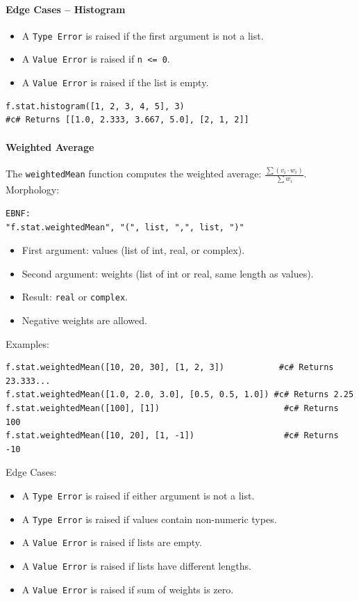 \paragraph{Edge Cases -- Histogram}
\begin{itemize}
\item A \texttt{Type Error} is raised if the first argument is not a list.
\item A \texttt{Value Error} is raised if \texttt{n <= 0}.
\item A \texttt{Value Error} is raised if the list is empty.
\end{itemize}

\begin{verbatim}
f.stat.histogram([1, 2, 3, 4, 5], 3)
#c# Returns [[1.0, 2.333, 3.667, 5.0], [2, 1, 2]]
\end{verbatim}

\paragraph{Weighted Average}
The \texttt{weightedMean} function computes the weighted average: $\frac{\sum(v_i \cdot w_i)}{\sum w_i}$.\\
Morphology:
\begin{verbatim}
EBNF:
"f.stat.weightedMean", "(", list, ",", list, ")"
\end{verbatim}
\begin{itemize}
\item First argument: values (list of int, real, or complex).
\item Second argument: weights (list of int or real, same length as values).
\item Result: \texttt{real} or \texttt{complex}.
\item Negative weights are allowed.
\end{itemize}

Examples:
\begin{verbatim}
f.stat.weightedMean([10, 20, 30], [1, 2, 3])           #c# Returns 23.333...
f.stat.weightedMean([1.0, 2.0, 3.0], [0.5, 0.5, 1.0]) #c# Returns 2.25
f.stat.weightedMean([100], [1])                         #c# Returns 100
f.stat.weightedMean([10, 20], [1, -1])                  #c# Returns -10
\end{verbatim}

Edge Cases:
\begin{itemize}
\item A \texttt{Type Error} is raised if either argument is not a list.
\item A \texttt{Type Error} is raised if values contain non-numeric types.
\item A \texttt{Value Error} is raised if lists are empty.
\item A \texttt{Value Error} is raised if lists have different lengths.
\item A \texttt{Value Error} is raised if sum of weights is zero.
\end{itemize}

